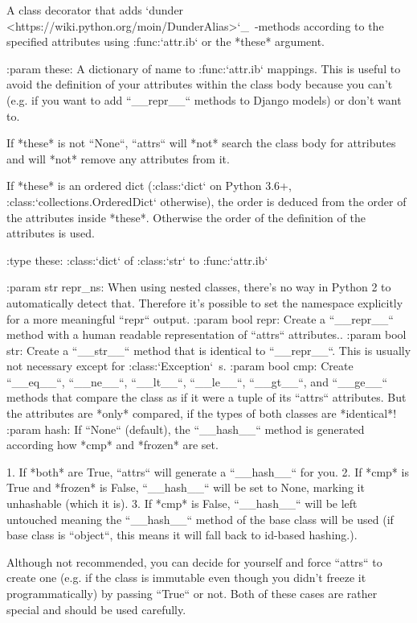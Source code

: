 \begin{DoxyVerb}A class decorator that adds `dunder
<https://wiki.python.org/moin/DunderAlias>`_\ -methods according to the
specified attributes using :func:`attr.ib` or the *these* argument.

:param these: A dictionary of name to :func:`attr.ib` mappings.  This is
    useful to avoid the definition of your attributes within the class body
    because you can't (e.g. if you want to add ``__repr__`` methods to
    Django models) or don't want to.

    If *these* is not ``None``, ``attrs`` will *not* search the class body
    for attributes and will *not* remove any attributes from it.

    If *these* is an ordered dict (:class:`dict` on Python 3.6+,
    :class:`collections.OrderedDict` otherwise), the order is deduced from
    the order of the attributes inside *these*.  Otherwise the order
    of the definition of the attributes is used.

:type these: :class:`dict` of :class:`str` to :func:`attr.ib`

:param str repr_ns: When using nested classes, there's no way in Python 2
    to automatically detect that.  Therefore it's possible to set the
    namespace explicitly for a more meaningful ``repr`` output.
:param bool repr: Create a ``__repr__`` method with a human readable
    representation of ``attrs`` attributes..
:param bool str: Create a ``__str__`` method that is identical to
    ``__repr__``.  This is usually not necessary except for
    :class:`Exception`\ s.
:param bool cmp: Create ``__eq__``, ``__ne__``, ``__lt__``, ``__le__``,
    ``__gt__``, and ``__ge__`` methods that compare the class as if it were
    a tuple of its ``attrs`` attributes.  But the attributes are *only*
    compared, if the types of both classes are *identical*!
:param hash: If ``None`` (default), the ``__hash__`` method is generated
    according how *cmp* and *frozen* are set.

    1. If *both* are True, ``attrs`` will generate a ``__hash__`` for you.
    2. If *cmp* is True and *frozen* is False, ``__hash__`` will be set to
       None, marking it unhashable (which it is).
    3. If *cmp* is False, ``__hash__`` will be left untouched meaning the
       ``__hash__`` method of the base class will be used (if base class is
       ``object``, this means it will fall back to id-based hashing.).

    Although not recommended, you can decide for yourself and force
    ``attrs`` to create one (e.g. if the class is immutable even though you
    didn't freeze it programmatically) by passing ``True`` or not.  Both of
    these cases are rather special and should be used carefully.


\end{DoxyVerb}
